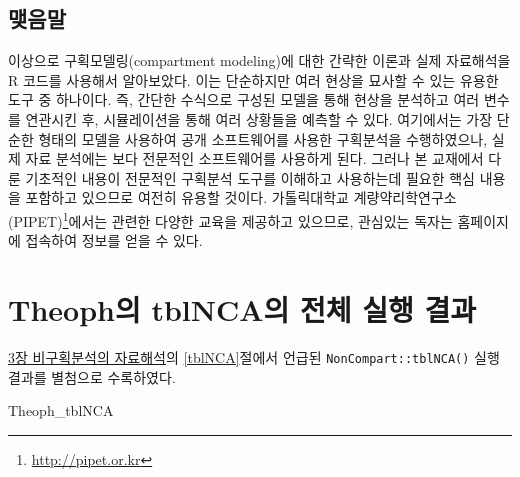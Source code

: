 \documentclass[
  11pt,
  krantz2, a4paper, twoside]{krantz}
\newenvironment{Shaded}{\begin{snugshade}}{\end{snugshade}}
\newcommand{\NormalTok}[1]{#1}
\theoremstyle{definition}
\theoremstyle{definition}
\theoremstyle{definition}
\theoremstyle{definition}
\theoremstyle{remark}
\begin{document}
\hypertarget{uxb9fauxc74cuxb9d0-4}{%
\section{맺음말}\label{uxb9fauxc74cuxb9d0-4}}

이상으로 구획모델링(compartment modeling)에 대한 간략한 이론과 실제 자료해석을 R 코드를 사용해서 알아보았다. 
이는 단순하지만 여러 현상을 묘사할 수 있는 유용한 도구 중 하나이다.
즉, 간단한 수식으로 구성된 모델을 통해 현상을 분석하고 여러 변수를 연관시킨 후, 시뮬레이션을 통해 여러 상황들을 예측할 수 있다. 
여기에서는 가장 단순한 형태의 모델을 사용하여 공개 소프트웨어를 사용한 구획분석을 수행하였으나, 실제 자료 분석에는 보다 전문적인 소프트웨어를 사용하게 된다.
그러나 본 교재에서 다룬 기초적인 내용이 전문적인 구획분석 도구를 이해하고 사용하는데 필요한 핵심 내용을 포함하고 있으므로 여전히 유용할 것이다.
가톨릭대학교 계량약리학연구소(PIPET)\footnote{\url{http://pipet.or.kr}}에서는 관련한 다양한 교육을 제공하고 있으므로, 관심있는 독자는 홈페이지에 접속하여 정보를 얻을 수 있다.

\cleardoublepage

\hypertarget{appendix-uxbcc4uxcca8}{%
\appendix {}}


\hypertarget{Theoph_tblNCA}{%
\chapter{Theoph의 tblNCA의 전체 실행 결과}\label{Theoph_tblNCA}}

\protect\hyperlink{nca-analysis}{3장 비구획분석의 자료해석}의 \ref{tblNCA}절에서 언급된 \texttt{NonCompart::tblNCA()} 실행결과를 별첨으로 수록하였다.

\tiny

\begin{Shaded}
\begin{Highlighting}[]
\NormalTok{Theoph\_tblNCA}
\end{Highlighting}
\end{Shaded}
\end{document}
